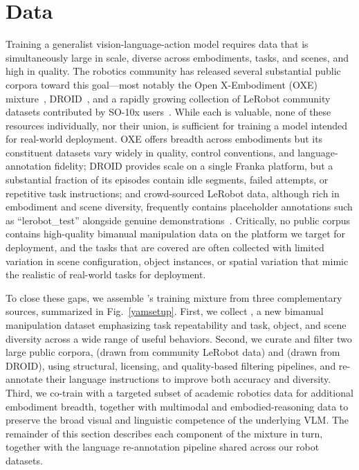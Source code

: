\section{Data}
\label{sec:data}

Training a generalist vision-language-action model requires data that is
simultaneously large in scale, diverse across embodiments, tasks, and scenes,
and high in quality. The robotics community has released several substantial
public corpora toward this goal---most notably the Open X-Embodiment (OXE)
mixture~\citep{o2024open}, DROID~\citep{khazatsky2024droid}, and a rapidly
growing collection of LeRobot community datasets contributed by
SO-10x users~\citep{shukor2025smolvlavisionlanguageactionmodelaffordable}. While each is valuable, none of these
resources individually, nor their union, is sufficient for training a model
intended for real-world deployment. OXE offers breadth across embodiments
but its constituent datasets vary widely in quality, control conventions,
and language-annotation fidelity; DROID provides scale on a single Franka
platform, but a substantial fraction of its episodes contain idle segments,
failed attempts, or repetitive task instructions; and crowd-sourced LeRobot
data, although rich in embodiment and scene diversity, frequently contains
placeholder annotations such as ``lerobot\_test'' alongside genuine
demonstrations~\citep{shukor2025smolvlavisionlanguageactionmodelaffordable}.
Critically, no public corpus contains high-quality bimanual manipulation
data on the platform we target for deployment, and the tasks that are
covered are often collected with limited variation in scene configuration,
object instances, or spatial variation that mimic the realistic of real-world tasks for deployment.

To close these gaps, we assemble \molmoactt's training mixture from three
complementary sources, summarized in Fig.~\ref{yamsetup}. First, we collect
\molmoacttyamdata, a new bimanual manipulation dataset emphasizing task
repeatability and task, object, and scene diversity across a wide range of
useful behaviors. Second, we curate and filter two large public corpora,
\molmoacttsodata (drawn from community LeRobot data) and \molmoacttdroiddata
(drawn from DROID), using structural, licensing, and quality-based
filtering pipelines, and re-annotate their language instructions to improve
both accuracy and diversity. Third, we co-train with a targeted subset of
academic robotics data for additional embodiment breadth, together with
multimodal and embodied-reasoning data to preserve the broad visual and
linguistic competence of the underlying VLM. The remainder of this section
describes each component of the mixture in turn, together with the language
re-annotation pipeline shared across our robot datasets.

